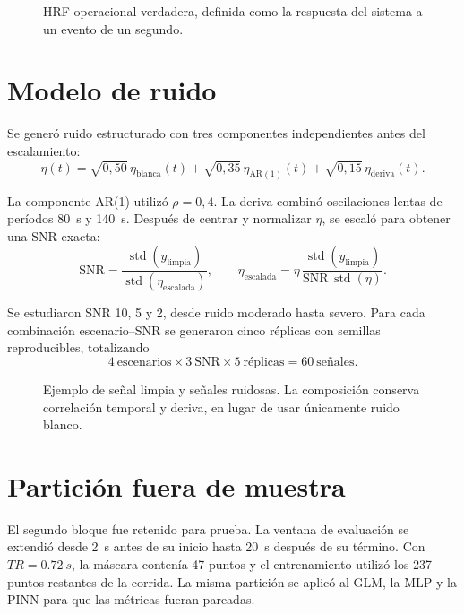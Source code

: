 \begin{figure}[H]
\centering
{}
\caption{HRF operacional verdadera, definida como la respuesta del sistema a un evento de un segundo.}
\label{fig:true_hrf}
\end{figure}

\section{Modelo de ruido}
Se generó ruido estructurado con tres componentes independientes antes del escalamiento:
\begin{equation}
\eta(t)=\sqrt{0{,}50}\,\eta_{\mathrm{blanca}}(t)+
\sqrt{0{,}35}\,\eta_{\mathrm{AR(1)}}(t)+
\sqrt{0{,}15}\,\eta_{\mathrm{deriva}}(t).
\end{equation}

La componente AR(1) utilizó $\rho=0{,}4$. La deriva combinó oscilaciones lentas de períodos \SI{80}{s} y \SI{140}{s}. Después de centrar y normalizar $\eta$, se escaló para obtener una SNR exacta:
\begin{equation}
\mathrm{SNR}=\frac{\operatorname{std}(y_{\mathrm{limpia}})}{\operatorname{std}(\eta_{\mathrm{escalada}})},
\qquad
\eta_{\mathrm{escalada}}=\eta\,\frac{\operatorname{std}(y_{\mathrm{limpia}})}{\mathrm{SNR}\,\operatorname{std}(\eta)}.
\label{eq:snr}
\end{equation}

Se estudiaron SNR 10, 5 y 2, desde ruido moderado hasta severo. Para cada combinación escenario--SNR se generaron cinco réplicas con semillas reproducibles, totalizando
\begin{equation}
4\ \text{escenarios}\times3\ \text{SNR}\times5\ \text{réplicas}=60\ \text{señales}.
\end{equation}

\begin{figure}[H]
\centering
{}
\caption{Ejemplo de señal limpia y señales ruidosas. La composición conserva correlación temporal y deriva, en lugar de usar únicamente ruido blanco.}
\label{fig:synthetic_noise}
\end{figure}

\section{Partición fuera de muestra}
El segundo bloque fue retenido para prueba. La ventana de evaluación se extendió desde \SI{2}{s} antes de su inicio hasta \SI{20}{s} después de su término. Con $TR=\SI{0.72}{s}$, la máscara contenía 47 puntos y el entrenamiento utilizó los 237 puntos restantes de la corrida. La misma partición se aplicó al GLM, la MLP y la PINN para que las métricas fueran pareadas.
